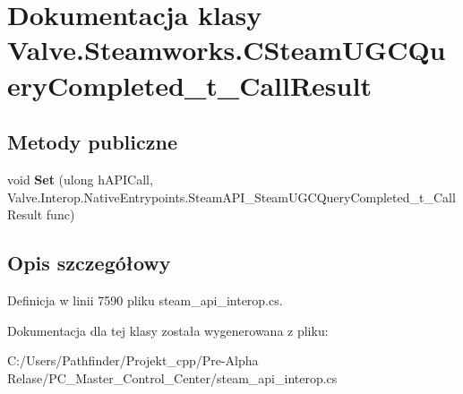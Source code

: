 \hypertarget{class_valve_1_1_steamworks_1_1_c_steam_u_g_c_query_completed__t___call_result}{}\section{Dokumentacja klasy Valve.\+Steamworks.\+C\+Steam\+U\+G\+C\+Query\+Completed\+\_\+t\+\_\+\+Call\+Result}
\label{class_valve_1_1_steamworks_1_1_c_steam_u_g_c_query_completed__t___call_result}
\subsection*{Metody publiczne}
\begin{DoxyCompactItemize}
\item 
\mbox{\label{class_valve_1_1_steamworks_1_1_c_steam_u_g_c_query_completed__t___call_result_a13264dddca69897b99280c333d6a4ecb}} 
void {\bfseries Set} (ulong h\+A\+P\+I\+Call, Valve.\+Interop.\+Native\+Entrypoints.\+Steam\+A\+P\+I\+\_\+\+Steam\+U\+G\+C\+Query\+Completed\+\_\+t\+\_\+\+Call\+Result func)
\end{DoxyCompactItemize}


\subsection{Opis szczegółowy}


Definicja w linii 7590 pliku steam\+\_\+api\+\_\+interop.\+cs.



Dokumentacja dla tej klasy została wygenerowana z pliku\+:\begin{DoxyCompactItemize}
\item 
C\+:/\+Users/\+Pathfinder/\+Projekt\+\_\+cpp/\+Pre-\/\+Alpha Relase/\+P\+C\+\_\+\+Master\+\_\+\+Control\+\_\+\+Center/steam\+\_\+api\+\_\+interop.\+cs\end{DoxyCompactItemize}
